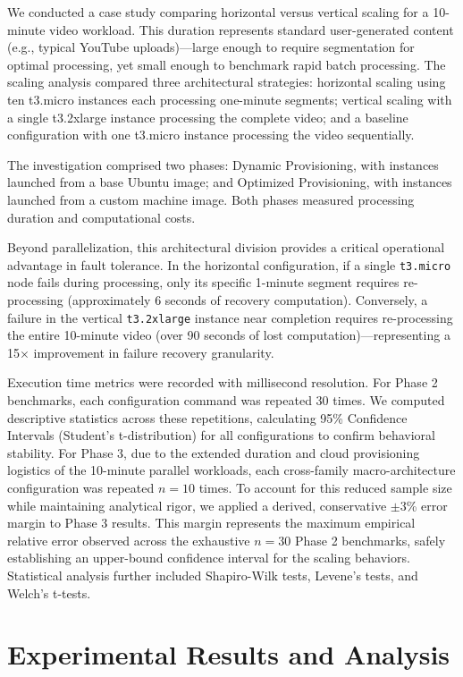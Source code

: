 \documentclass[conference]{IEEEtran}
\begin{document}
	We conducted a case study comparing horizontal versus vertical scaling for a 10-minute video workload. This duration represents standard user-generated content (e.g., typical YouTube uploads)—large enough to require segmentation for optimal processing, yet small enough to benchmark rapid batch processing. The scaling analysis compared three architectural strategies: horizontal scaling using ten t3.micro instances each processing one-minute segments; vertical scaling with a single t3.2xlarge instance processing the complete video; and a baseline configuration with one t3.micro instance processing the video sequentially.
	
	The investigation comprised two phases: Dynamic Provisioning, with instances launched from a base Ubuntu image; and Optimized Provisioning, with instances launched from a custom machine image. Both phases measured processing duration and computational costs.
	
	Beyond parallelization, this architectural division provides a critical operational advantage in fault tolerance. In the horizontal configuration, if a single \texttt{t3.micro} node fails during processing, only its specific 1-minute segment requires re-processing (approximately 6 seconds of recovery computation). Conversely, a failure in the vertical \texttt{t3.2xlarge} instance near completion requires re-processing the entire 10-minute video (over 90 seconds of lost computation)—representing a 15× improvement in failure recovery granularity.
	
	Execution time metrics were recorded with millisecond resolution. For Phase 2 benchmarks, each configuration command was repeated 30 times. We computed descriptive statistics across these repetitions, calculating 95\% Confidence Intervals (Student's t-distribution) for all configurations to confirm behavioral stability. For Phase 3, due to the extended duration and cloud provisioning logistics of the 10-minute parallel workloads, each cross-family macro-architecture configuration was repeated $n=10$ times. To account for this reduced sample size while maintaining analytical rigor, we applied a derived, conservative $\pm$3\% error margin to Phase 3 results. This margin represents the maximum empirical relative error observed across the exhaustive $n=30$ Phase 2 benchmarks, safely establishing an upper-bound confidence interval for the scaling behaviors. Statistical analysis further included Shapiro-Wilk tests, Levene's tests, and Welch's t-tests.
	
	
	\section{Experimental Results and Analysis}
	\label{experiments}
	
\end{document}
